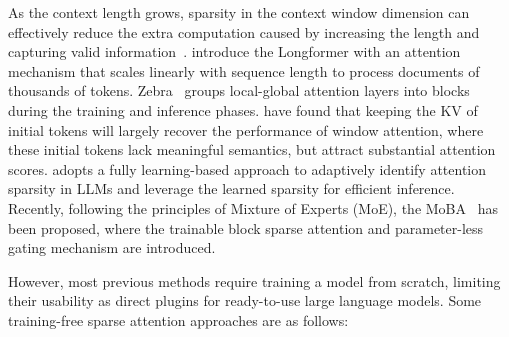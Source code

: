 \documentclass[11pt, a4paper, logo, copyright, nonumbering]{map}
\begin{document}
As the context length grows, 
sparsity in the context window dimension can effectively reduce the extra computation caused by increasing the length and capturing valid information~\citep{lucas2024extraglobalattentiondesignation, wang2020linformerselfattentionlinearcomplexity,leviathan2024selectiveattentionimprovestransformer}. \citet{DBLP:journals/corr/abs-2004-05150} introduce the Longformer with an attention
mechanism that scales linearly with sequence
length to process documents of thousands of tokens.
Zebra~\citep{song2023zebraextendingcontextwindow} groups local-global attention layers into blocks during the training and inference phases. 
\citet{xiao2024efficientstreaminglanguagemodels} have found that keeping the KV of initial tokens will largely recover the performance of window attention, where these initial tokens lack meaningful semantics, but attract substantial attention scores. 
\citet{gao2024seerattentionlearningintrinsicsparse} adopts a fully learning-based approach to adaptively identify attention sparsity in LLMs and leverage the learned sparsity for efficient inference.
Recently, following the principles of Mixture of Experts (MoE),  the MoBA~\cite{lu2025mobamixtureblockattention} has been proposed, where the trainable block sparse attention and parameter-less gating mechanism are introduced.

However, most previous methods require training a model from scratch, limiting their usability as direct plugins for ready-to-use large language models. Some training-free sparse attention approaches are as follows:
\end{document}
